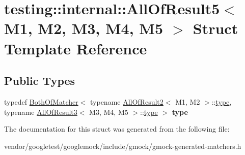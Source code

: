 \hypertarget{structtesting_1_1internal_1_1_all_of_result5}{}\section{testing\+:\+:internal\+:\+:All\+Of\+Result5$<$ M1, M2, M3, M4, M5 $>$ Struct Template Reference}
\label{structtesting_1_1internal_1_1_all_of_result5}
\subsection*{Public Types}
\begin{DoxyCompactItemize}
\item 
\mbox{\label{structtesting_1_1internal_1_1_all_of_result5_aee2e1fb803f428741d147347b692d108}} 
typedef \mbox{\hyperlink{classtesting_1_1internal_1_1_both_of_matcher}{Both\+Of\+Matcher}}$<$ typename \mbox{\hyperlink{structtesting_1_1internal_1_1_all_of_result2}{All\+Of\+Result2}}$<$ M1, M2 $>$\+::\mbox{\hyperlink{classtesting_1_1internal_1_1_both_of_matcher}{type}}, typename \mbox{\hyperlink{structtesting_1_1internal_1_1_all_of_result3}{All\+Of\+Result3}}$<$ M3, M4, M5 $>$\+::\mbox{\hyperlink{classtesting_1_1internal_1_1_both_of_matcher}{type}} $>$ {\bfseries type}
\end{DoxyCompactItemize}


The documentation for this struct was generated from the following file\+:\begin{DoxyCompactItemize}
\item 
vendor/googletest/googlemock/include/gmock/gmock-\/generated-\/matchers.\+h\end{DoxyCompactItemize}
